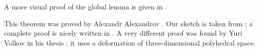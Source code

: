 A more visual proof of the global lemma is given in \cite[II \S 1.3]{alexandrov}.

This theorem was proved by Alexandr Alexandrov \cite{alexandrov-1941}.
Our sketch is taken from \cite{lebedeva-petrunin};
a complete proof is nicely written in \cite{alexandrov}.
A very different proof was found by Yuri Volkov in his thesis \cite{volkov};
it uses a deformation of three-dimensional polyhedral space.
